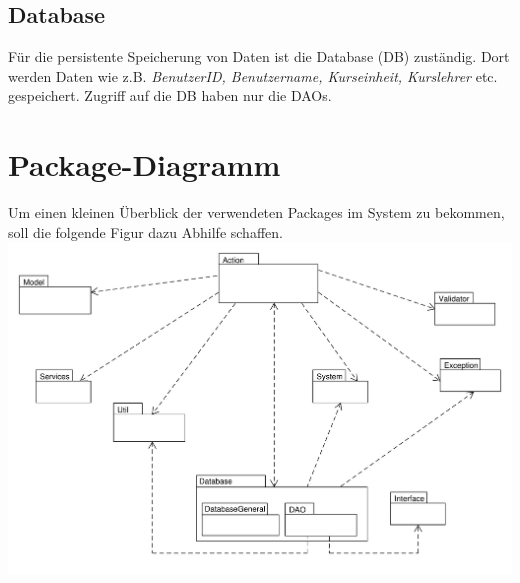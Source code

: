     \subsection{Database}
    Für die persistente Speicherung von Daten ist die Database (DB) zuständig. Dort werden Daten wie z.B. \textit{BenutzerID, Benutzername, Kurseinheit, Kurslehrer} etc. gespeichert. Zugriff auf die DB haben nur die DAOs. 

\section{Package-Diagramm}
 Um einen kleinen Überblick der verwendeten Packages im System zu bekommen, soll die folgende Figur dazu Abhilfe schaffen. \\ 
\includegraphics[scale=0.45]{Grafiken/PackageDiagramm.pdf}      
    
